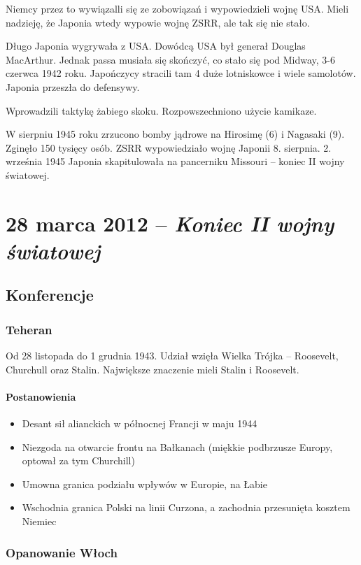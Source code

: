\documentclass [a4paper, 11pt, oneside]{book}
\begin{document}
Niemcy przez to wywiązalli się ze zobowiązań i wypowiedzieli wojnę USA. Mieli nadzieję, że Japonia wtedy wypowie wojnę ZSRR, ale tak się nie stało.

Długo Japonia wygrywała z USA. Dowódcą USA był generał Douglas MacArthur. Jednak passa musiała się skończyć, co stało się pod Midway, 3-6 czerwca 1942 roku. Japończycy stracili tam 4 duże lotniskowce i wiele samolotów. Japonia przeszła do defensywy.

Wprowadzili taktykę żabiego skoku. Rozpowszechniono użycie kamikaze.

W sierpniu 1945 roku zrzucono bomby jądrowe na Hirosimę (6) i Nagasaki (9). Zginęło 150 tysięcy osób. ZSRR wypowiedziało wojnę Japonii 8. sierpnia. 2. września 1945 Japonia skapitulowała na pancerniku Missouri -- koniec II wojny światowej.

\chapter{28 marca 2012 -- \textit{Koniec II wojny światowej}}

\section{Konferencje}

\subsection{Teheran}
Od 28 listopada do 1 grudnia 1943. Udział wzięła Wielka Trójka -- Roosevelt, Churchull oraz Stalin. Największe znaczenie mieli Stalin i Roosevelt. 
\subsubsection{Postanowienia}
\begin{itemize}
\item Desant sił alianckich w północnej Francji w maju 1944
\item Niezgoda na otwarcie frontu na Bałkanach (miękkie podbrzusze Europy, optował za tym Churchill)
\item Umowna granica podziału wpływów w Europie, na Łabie
\item Wschodnia granica Polski na linii Curzona, a zachodnia przesunięta kosztem Niemiec
\end{itemize}

\subsection{Opanowanie Włoch}
\end{document}
